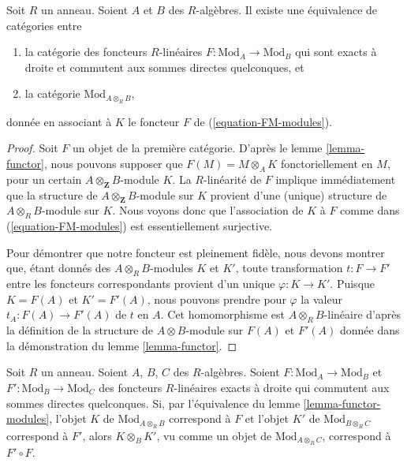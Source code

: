 \begin{lemma}
\label{lemma-functor-modules}
Soit $R$ un anneau. Soient $A$ et $B$ des $R$-algèbres. Il existe une
équivalence de catégories entre
\begin{enumerate}
\item la catégorie des foncteurs $R$-linéaires
$F : \text{Mod}_A \to \text{Mod}_B$ qui
sont exacts à droite et commutent aux sommes directes quelconques, et
\item la catégorie $\text{Mod}_{A \otimes_R B}$,
\end{enumerate}
donnée en associant à $K$ le foncteur $F$ de (\ref{equation-FM-modules}).
\end{lemma}

\begin{proof}
Soit $F$ un objet de la première catégorie. D'après le
lemme \ref{lemma-functor}, nous pouvons supposer que $F(M) = M \otimes_A K$
fonctoriellement en $M$, pour un certain $A \otimes_\mathbf{Z} B$-module $K$.
La $R$-linéarité de $F$ implique immédiatement que la structure de
$A \otimes_\mathbf{Z} B$-module sur $K$ provient
d'une (unique) structure de $A \otimes_R B$-module sur $K$.
Nous voyons donc que l'association de $K$ à $F$ comme dans (\ref{equation-FM-modules})
est essentiellement surjective.

\medskip\noindent
Pour démontrer que notre foncteur est pleinement fidèle, nous devons montrer que,
étant donnés des $A \otimes_R B$-modules $K$ et $K'$, toute transformation
$t : F \to F'$ entre les foncteurs correspondants provient
d'un unique $\varphi : K \to K'$. Puisque $K = F(A)$ et $K' = F'(A)$,
nous pouvons prendre pour $\varphi$ la valeur $t_A : F(A) \to F'(A)$
de $t$ en $A$. Cet homomorphisme est $A \otimes_R B$-linéaire d'après la
définition de la structure de $A \otimes B$-module sur $F(A)$
et $F'(A)$ donnée dans la démonstration du lemme \ref{lemma-functor}.
\end{proof}

\begin{remark}
\label{remark-composition}
Soit $R$ un anneau. Soient $A$, $B$, $C$ des $R$-algèbres.
Soient $F : \text{Mod}_A \to \text{Mod}_B$ et
$F' : \text{Mod}_B \to \text{Mod}_C$ des foncteurs
$R$-linéaires exacts à droite qui commutent aux sommes directes quelconques.
Si, par l'équivalence du lemme \ref{lemma-functor-modules}, l'objet
$K$ de $\text{Mod}_{A \otimes_R B}$ correspond à $F$ et l'objet
$K'$ de $\text{Mod}_{B \otimes_R C}$ correspond à $F'$, alors
$K \otimes_B K'$, vu comme un objet de
$\text{Mod}_{A \otimes_R C}$, correspond à $F' \circ F$.
\end{remark}

